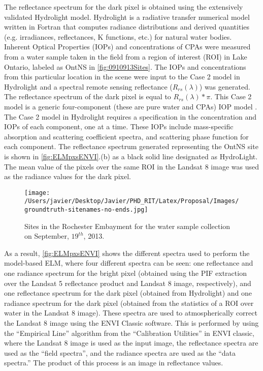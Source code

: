 \documentclass[]{spie}  %
\begin{document}
The reflectance spectrum for the dark pixel is obtained using the extensively validated Hydrolight model\cite{MobleyHE}. Hydrolight is a radiative transfer numerical model written in Fortran that computes radiance distributions and derived quantities (e.g. irradiances, reflectances, K functions, etc.) for natural water bodies. Inherent Optical Properties (IOPs) and concentrations of CPAs were measured from a water sample taken in the field from a region of interest (ROI) in Lake Ontario, labeled as OntNS in \autoref{fig:0910913Sites}. The IOPs and concentrations from this particular location in the scene were input to the Case 2 model in Hydrolight and a spectral remote sensing reflectance ($R_{rs}(\lambda)$) was generated. The reflectance spectrum of the dark pixel is equal to $R_{rs}(\lambda)*\pi$. This Case 2 model is a generic four-component (these are pure water and CPAs) IOP model \cite{MobleyHEtech}. The Case 2 model in Hydrolight requires a specification in the concentration and IOPs of each component, one at a time. These IOPs include mass-specific absorption and scattering coefficient spectra, and scattering phase function for each component. The reflectance spectrum generated representing the OntNS site is shown in \autoref{fig:ELMpxsENVI}.(b) as a black solid line designated as HydroLight. The mean value of the pixels over the same ROI in the Landsat 8 image was used as the radiance values for the dark pixel.

\begin{figure}[htb]
  \centering
  \texttt{[image: /Users/javier/Desktop/Javier/PHD\_RIT/Latex/Proposal/Images/groundtruth-sitenames-no-ends.jpg]}
  \caption{Sites in the Rochester Embayment for the water sample collection on September, $19^{th}$, 2013.\label{fig:0910913Sites} } 
\end{figure}

As a result, \autoref{fig:ELMpxsENVI} shows the different spectra used to perform the model-based ELM, where four different spectra can be seen: one reflectance and one radiance spectrum for the bright pixel (obtained using the PIF extraction over the Landsat 5 reflectance product and Landsat 8 image, respectively), and one reflectance spectrum for the dark pixel (obtained from Hydrolight) and one radiance spectrum for the dark pixel (obtained from the statistics of a ROI over water in the Landsat 8 image). These spectra are used to atmospherically correct the Landsat 8 image using the ENVI Classic software\cite{ENVIUserGuide}. This is performed by using the ``Empirical Line'' algorithm from the ``Calibration Utilities'' in ENVI classic, where the Landsat 8 image is used as the input image, the reflectance spectra are used as the ``field spectra'', and the radiance spectra are used as the ``data spectra.'' The product of this process is an image in reflectance values. 
\end{document}
